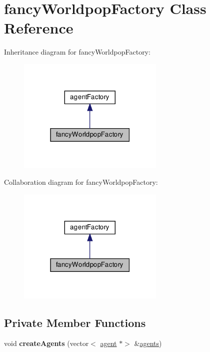 \hypertarget{classfancyWorldpopFactory}{}\section{fancy\+Worldpop\+Factory Class Reference}
\label{classfancyWorldpopFactory}


Inheritance diagram for fancy\+Worldpop\+Factory\+:\nopagebreak
\begin{figure}[H]
\begin{center}
\leavevmode
\includegraphics[width=198pt]{classfancyWorldpopFactory__inherit__graph}
\end{center}
\end{figure}


Collaboration diagram for fancy\+Worldpop\+Factory\+:\nopagebreak
\begin{figure}[H]
\begin{center}
\leavevmode
\includegraphics[width=198pt]{classfancyWorldpopFactory__coll__graph}
\end{center}
\end{figure}
\subsection*{Private Member Functions}
\begin{DoxyCompactItemize}
\item 
\mbox{\label{classfancyWorldpopFactory_a02ec5ffbb45ff8975f6e142dcd4520e3}} 
void {\bfseries create\+Agents} (vector$<$ \mbox{\hyperlink{classagent}{agent}} $\ast$$>$ \&\mbox{\hyperlink{classagents}{agents}})
\end{DoxyCompactItemize}
